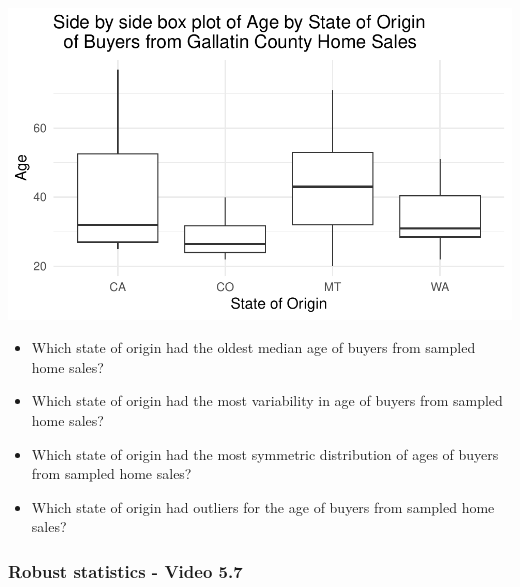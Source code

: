 \documentclass[
]{report}
\providecommand{\tightlist}{%
  \setlength{\itemsep}{0pt}\setlength{\parskip}{0pt}}
\begin{document}
\begin{center}\includegraphics[width=0.85\linewidth]{06-VN06-EDAonemeanSim_files/figure-latex/unnamed-chunk-7-1} \end{center}

\begin{itemize}
\tightlist
\item
  Which state of origin had the oldest median age of buyers from sampled home sales?
\end{itemize}

\vspace{0.4in}

\begin{itemize}
\tightlist
\item
  Which state of origin had the most variability in age of buyers from sampled home sales?
\end{itemize}

\vspace{0.4in}

\begin{itemize}
\tightlist
\item
  Which state of origin had the most symmetric distribution of ages of buyers from sampled home sales?
\end{itemize}

\vspace{0.4in}

\begin{itemize}
\tightlist
\item
  Which state of origin had outliers for the age of buyers from sampled home sales?
\end{itemize}

\vspace{0.4in}

\newpage

\subsubsection*{Robust statistics - Video 5.7}\label{robust-statistics---video-5.7}
\end{document}
